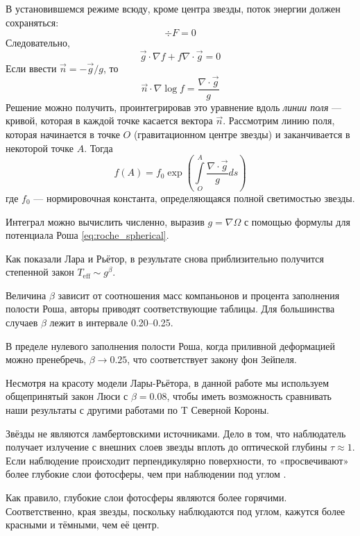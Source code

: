 В установившемся режиме всюду, кроме центра звезды, поток энергии должен сохраняться:
\[
\div F = 0
\]
Следовательно,
\[
\vec g \cdot \nabla f + f \nabla \cdot \vec g = 0
\]
Если ввести $\vec n = -\vec g / g$, то
\[
\vec n \cdot \nabla \log f = \frac{\nabla \cdot \vec g}{g}
\]
Решение можно получить, проинтегрировав это уравнение вдоль \emph{линии поля} --- кривой, которая в каждой точке касается вектора $\vec n$. Рассмотрим линию поля, которая начинается в точке $O$ (гравитационном центре звезды) и заканчивается в некоторой точке $A$. Тогда
\begin{equation*}
f(A) = f_0 \exp \left(
    {}\int\limits_O^A \frac{\nabla \cdot \vec g}{g} ds
\right)
\label{eq:LaraSolution}
\end{equation*}
где $f_0$ --- нормировочная константа, определяющаяся полной светимостью звезды.

Интеграл можно вычислить численно, выразив $g = \nabla \Omega$ с помощью формулы для потенциала Роша \eqref{eq:roche_spherical}.

Как показали Лара и Рьётор, в результате снова приблизительно получится степенной закон $T_\text{eff} \sim g^\beta$.

Величина $\beta$ зависит от соотношения масс компаньонов и процента заполнения полости Роша, авторы приводят соответствующие таблицы. Для большинства случаев $\beta$ лежит в интервале 0.20--0.25.

В пределе нулевого заполнения полости Роша, когда приливной деформацией можно пренебречь, $\beta \to 0.25$, что соответствует закону фон Зейпеля.

Несмотря на красоту модели Лары-Рьётора, в данной работе мы используем общепринятый закон Люси с $\beta = 0.08$, чтобы иметь возможность сравнивать наши результаты с другими работами по T Северной Короны.



Звёзды не являются ламбертовскими источниками. Дело в том, что наблюдатель получает излучение с внешних слоев звезды вплоть до оптической глубины $\tau \approx 1$. Если наблюдение происходит перпендикулярно поверхности, то «просвечивают» более глубокие слои фотосферы, чем при наблюдении под углом \cite{StellarSpectroscopy}.

Как правило, глубокие слои фотосферы являются более горячими. Соответственно, края звезды, поскольку наблюдаются под углом, кажутся более красными и тёмными, чем её центр.


